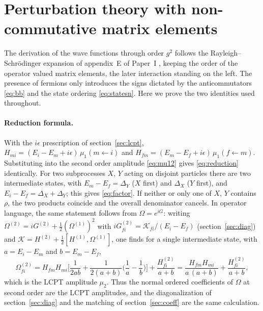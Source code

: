 \documentclass[11pt,a4paper]{article}
\numberwithin{equation}{section}
\newcommand{\OM}{\Omega}
\begin{document}
\section{Perturbation theory with non-commutative matrix elements}
\label{app:pt}

The derivation of the wave functions through order $g^{2}$ follows the Rayleigh--Schr\"odinger
expansion of appendix~E of Paper~I \cite{Landau:1991,Shankar:2012}, keeping the order of the operator
valued matrix elements, the later interaction standing on the left. The presence of fermions only
introduces the signs dictated by the anticommutators \eqref{eq:bb} and the state ordering
\eqref{eq:statesn}. Here we prove the two identities used throughout.

\paragraph{Reduction formula.} With the $i\epsilon$ prescription of section~\ref{sec:lcpt},
$H_{mi}=(E_{i}-E_{m}+i\epsilon)\,\mu_{1}(m\leftarrow i)$ and $H_{fm}=(E_{m}-E_{f}+i\epsilon)\,\mu_{1}(f\leftarrow m)$.
Substituting into the second order amplitude \eqref{eq:mu12} gives \eqref{eq:reduction} identically.
For two subprocesses $X$, $Y$ acting on disjoint particles there are two intermediate states, with
$E_{m}-E_{f}=\Delta_{Y}$ ($X$ first) and $\Delta_{X}$ ($Y$ first), and $E_{i}-E_{f}=\Delta_{X}+\Delta_{Y}$; this
gives \eqref{eq:factor}. If neither or only one of $X$, $Y$ contains $\rho$, the two products coincide and
the overall denominator cancels. In operator language, the same statement follows from
$\OM=e^{iG}$: writing $\OM^{(2)}=iG^{(2)}+\tfrac12(\OM^{(1)})^{2}$ with
$iG^{(2)}_{fi}=\mathcal K_{fi}/(E_{i}-E_{f})$ (section~\ref{sec:diag}) and
$\mathcal K=H^{(2)}+\tfrac12[H^{(1)},\OM^{(1)}]$, one finds for a single intermediate state, with
$a=E_{i}-E_{m}$ and $b=E_{m}-E_{f}$,
\begin{equation}
\OM^{(2)}_{fi}=H_{fm}H_{mi}\Big[\frac{1}{2ab}+\frac{1}{2(a+b)}\Big(\frac1a-\frac1b\Big)\Big]
+\frac{H^{(2)}_{fi}}{a+b}
=\frac{H_{fm}H_{mi}}{a\,(a+b)}+\frac{H^{(2)}_{fi}}{a+b},
\end{equation}
which is the LCPT amplitude $\mu_{2}$. Thus the normal ordered coefficients of $\OM$ at second order are
the LCPT amplitudes, and the diagonalization of section~\ref{sec:diag} and the matching of
section~\ref{sec:coeff} are the same calculation.
\end{document}
